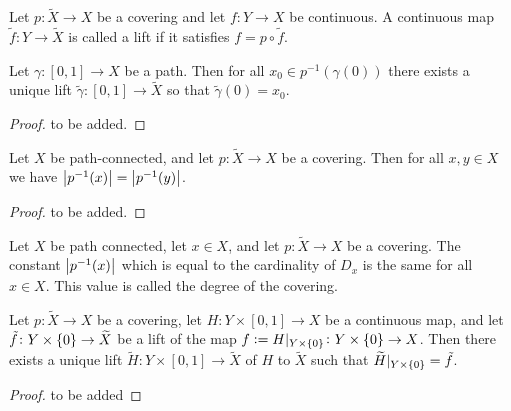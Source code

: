 \documentclass[11pt,a4paper]{article}
\begin{document}

\begin{definition}[Lift]
  Let $p \colon \widetilde X \to X$ be a covering and
  let $f \colon Y \to X$ be continuous.
  A continuous map $\tilde f \colon Y \to \widetilde X$ is called a lift
  if it satisfies $f = p \circ \tilde f$.
\end{definition}

\begin{lemma}
  Let $\gamma \colon [0,1] \to X$ be a path.
  Then for all $x_0 \in p^{-1}(\gamma(0))$ there exists a unique lift
  $\tilde \gamma \colon [0,1] \to \widetilde X$ so that $\tilde \gamma(0) = x_0$.
\end{lemma}
\begin{proof}
  to be added.
\end{proof}

\begin{proposition}
  Let $X$ be path-connected,
  and let $p \colon \widetilde X \to X$ be a covering.
  Then for all $x,y \in X$ we have $\left\lvert p^{-1}(x)\right\rvert = \left\lvert p^{-1}(y)\right\rvert$.
\end{proposition}
\begin{proof}
  to be added.
\end{proof}

\begin{definition}
  Let $X$ be path connected,
  let $x \in X$,
  and let $p \colon \widetilde X \to X$ be a covering.
  The constant $\left\lvert p^{-1}(x)\right\rvert$ which is equal to the
  cardinality of $D_x$ is the same for all $x \in X$.
  This value is called the degree of the covering.
\end{definition}

\begin{proposition}
  Let $p \colon \widetilde X \to X$ be a covering,
  let $H \colon Y \times [0,1] \to X$ be a continuous map,
  and let $\tilde f \colon Y \times \left\{0\right\} \to \widetilde X$ be a lift
  of the map
  $f := H\vert_{Y \times \left\{0\right\}} \colon Y \times \left\{0\right\} \to X$.
  Then there exists a unique lift
  $\widetilde H \colon Y \times [0,1] \to \widetilde X$ of $H$ to $\widetilde X$
  such that $\widetilde H\vert_{Y \times \left\{0\right\}} = \tilde f$.
\end{proposition}
\begin{proof}
  to be added %
\end{proof}
\end{document}
